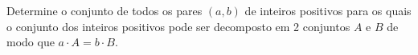 Determine o conjunto de todos os pares \((a,b)\) de inteiros positivos para os quais o conjunto dos inteiros positivos pode ser decomposto em 2 conjuntos \(A\) e \(B\) de modo que \(a \cdot A = b \cdot B\).
